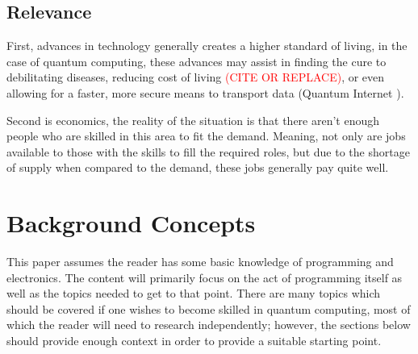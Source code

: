 \documentclass[a4paper]{article}
\newcommand{\tabhere}{} %
\begin{document}
\subsection{Relevance} %
\tabhere %
First, advances in technology generally creates a higher standard of living, in the case of quantum computing, these advances may assist in finding the cure to debilitating diseases, reducing cost of living \textcolor{red}{(CITE OR REPLACE)}, or even allowing for a faster, more secure means to transport data (Quantum Internet \cite{qinternetNature}).  \newline 

Second is economics, the reality of the situation is that there aren't enough people who are skilled in this area to fit the demand.  Meaning, not only are jobs available to those with the skills to fill the required roles, but due to the shortage of supply when compared to the demand, these jobs generally pay quite well.  \cite{qc5ycommercialize}
\label{AddMoreDetailHere}

\section{Background Concepts} %
\label{sec:backgroundconcepts}
This paper assumes the reader has some basic knowledge of programming and electronics.  The content will primarily focus on the act of programming itself as well as the topics needed to get to that point.  There are many topics which should be covered if one wishes to become skilled in quantum computing, most of which the reader will need to research independently; however, the sections below should provide enough context in order to provide a suitable starting point.
\end{document}
